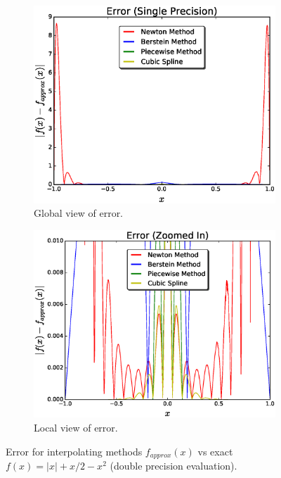 \documentclass[12pt]{article}
\theoremstyle{remark}
\begin{document}
\begin{figure}[H]
	\centering
	\begin{subfigure}{.5\textwidth}
		\centering
		\includegraphics[width=1.1\linewidth]{errorFig3.eps}
		\caption{Global view of error.}
		\label{fig:sub1}
	\end{subfigure}%
	\begin{subfigure}{.5\textwidth}
		\centering
		\includegraphics[width=1.1\linewidth]{errorFigg3.eps}
		\caption{Local view of error.}
		\label{fig:sub2}
	\end{subfigure}
	\caption{Error for interpolating methods $f_{approx}(x)$ vs exact $f(x) = \vert x \vert + x/2 - x^2$ (double precision evaluation). }
	\label{fig:test}
\end{figure}
\end{document}

